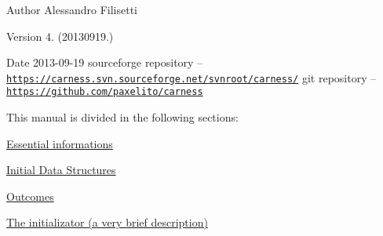 \begin{DoxyAuthor}{Author}
Alessandro Filisetti 
\end{DoxyAuthor}
\begin{DoxyVersion}{Version}
4. (20130919.) 
\end{DoxyVersion}
\begin{DoxyDate}{Date}
2013-\/09-\/19 sourceforge repository -- \href{https://carness.svn.sourceforge.net/svnroot/carness/}{\tt https\-://carness.\-svn.\-sourceforge.\-net/svnroot/carness/} git repository -- \href{https://github.com/paxelito/carness}{\tt https\-://github.\-com/paxelito/carness}
\end{DoxyDate}
This manual is divided in the following sections\-:
\begin{DoxyItemize}
\item \hyperlink{intro}{Essential informations}
\item \hyperlink{pageInitStr}{Initial Data Structures}
\item \hyperlink{pageoutcomes}{Outcomes}
\item \hyperlink{pageInitializator}{The initializator (a very brief description)} 
\end{DoxyItemize}